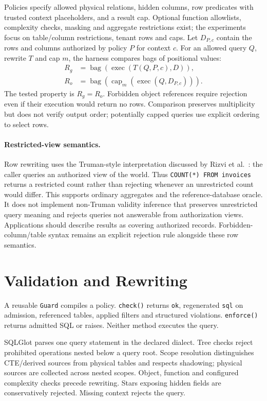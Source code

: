 \documentclass[sigconf,nonacm,natbib=false]{acmart}
\begin{document}
Policies specify allowed physical relations, hidden columns, row predicates
with trusted context placeholders, and a result cap. Optional function
allowlists, complexity checks, masking and aggregate restrictions exist;
the experiments focus on table/column restrictions, tenant rows and caps.
Let $D_{P,c}$ contain the rows and columns authorized by policy $P$ for
context $c$. For an allowed query $Q$, rewrite $T$ and cap $m$, the harness
compares bags of positional values:
\begin{align}
 R_g &= \operatorname{bag}(\operatorname{exec}(T(Q,P,c),D)),\\
 R_o &= \operatorname{bag}(\operatorname{cap}_{m}(\operatorname{exec}(Q,D_{P,c}))).
\end{align}
The tested property is $R_g=R_o$. Forbidden object references require
rejection even if their execution would return no rows. Comparison preserves
multiplicity but does not verify output order; potentially capped queries
use explicit ordering to select rows.

\paragraph{Restricted-view semantics.}
Row rewriting uses the Truman-style interpretation discussed by Rizvi
et al.\ \cite{rizvi2004}: the caller queries an authorized view of the world.
Thus \texttt{COUNT(*) FROM invoices} returns a restricted count rather than
rejecting whenever an unrestricted count would differ. This supports ordinary
aggregates and the reference-database oracle. It does not implement non-Truman
validity inference that preserves unrestricted query meaning and rejects
queries not answerable from authorization views. Applications should describe
results as covering authorized records. Forbidden-column/table syntax
remains an explicit rejection rule alongside these row semantics.

\section{Validation and Rewriting}
A reusable \texttt{Guard} compiles a policy. \texttt{check()} returns
\texttt{ok}, regenerated \texttt{sql} on admission, referenced tables, applied
filters and structured violations. \texttt{enforce()} returns admitted SQL
or raises. Neither method executes the query.

SQLGlot parses one query statement in the declared dialect. Tree checks
reject prohibited operations nested below a query root. Scope resolution
distinguishes CTE/derived sources from physical tables and respects shadowing;
physical sources are collected across nested scopes. Object, function and
configured complexity checks precede rewriting. Stars exposing hidden fields
are conservatively rejected. Missing context rejects the query.
\end{document}
